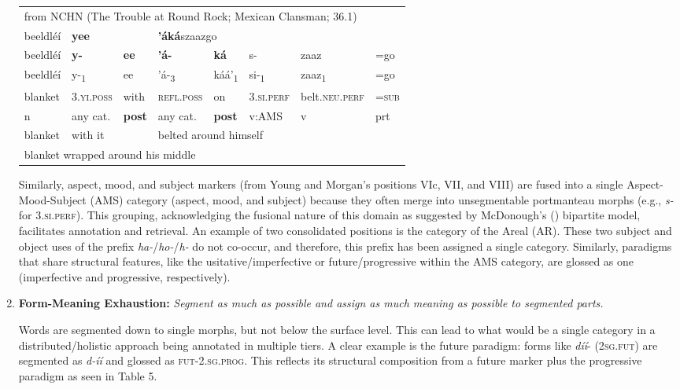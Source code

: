 \begin{enumerate}
\begin{table}
    \begin{tabular}{lp{}lllp{}ll}
        \multicolumn{8}{l}{from NCHN (The Trouble at Round Rock; Mexican Clansman; 36.1)}\\
        beeldléí&\multicolumn{2}{l}{\textbf{yee}}&\multicolumn{5}{l}{\textbf{’áká}szaazgo}\\
        beeldléí&\textbf{y-}&\textbf{ee}&\textbf{’á-}&\textbf{ká}&s-&zaaz&=go\\
        beeldléí&y-\textsubscript{1}&ee&’á-\textsubscript{3}&káá’\textsubscript{1}&si-\textsubscript{1}&zaaz\textsubscript{1}&=go\\
        blanket&3.\textsc{yi}.\textsc{poss}&with&\textsc{refl}.\textsc{poss}&on&3.\textsc{si}.\textsc{perf}&belt.\textsc{neu}.\textsc{perf}&=\textsc{sub}\\
        n&any cat.&\textbf{post}&any cat.&\textbf{post}&v:AMS&v&prt\\
        blanket&with it&&\multicolumn{5}{l}{belted around himself}\\
        \multicolumn{8}{l}{blanket wrapped around his middle}\\
    \end{tabular}   
\end{table}

    Similarly, aspect, mood, and subject markers (from Young and Morgan's positions VIc, VII, and VIII) are fused into a single Aspect-Mood-Subject (AMS) category (aspect, mood, and subject) because they often merge into unsegmentable portmanteau morphs (e.g., \textit{s-} for 3.\textsc{si}.\textsc{perf}). This grouping, acknowledging the fusional nature of this domain as suggested by McDonough's (\citeyear{McDonough:1995hp}) bipartite model, facilitates annotation and retrieval. An example of two consolidated positions is the category of the Areal (AR). These two subject and object uses of the prefix \textit{ha-}/\textit{ho-}/\textit{h-} do not co-occur, and therefore, this prefix has been assigned a single category. Similarly, paradigms that share structural features, like the usitative/imperfective or future/progressive within the AMS category, are glossed as one (imperfective and progressive, respectively).

    \item \textbf{Form-Meaning Exhaustion:} \textit{Segment as much as possible and assign as much meaning as possible to segmented parts.}

    Words are segmented down to single morphs, but not below the surface level. This can lead to what would be a single category in a distributed/holistic approach being annotated in multiple tiers. A clear example is the future paradigm: forms like \textit{díí}- (2\textsc{sg}.\textsc{fut}) are segmented as \textit{d-íí} and glossed as \textsc{fut}-2.\textsc{sg}.\textsc{prog}. This reflects its structural composition from a future marker plus the progressive paradigm as seen in Table 5.


\end{enumerate}
